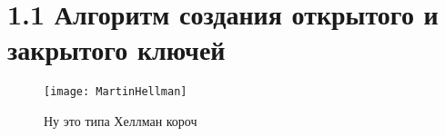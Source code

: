 
\section*{1.1 Алгоритм создания открытого и закрытого ключей }

\begin{figure}[h]	
\begin{center}
		\texttt{[image: MartinHellman]}
		\caption{Ну это типа Хеллман короч}
\end{center}
\end{figure}